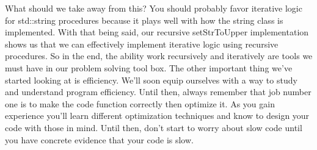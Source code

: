 \documentclass[]{tufte-handout}
\begin{document}
What should we take away from this? You should probably favor iterative logic for std::string procedures because it plays well with how the string class is implemented. With that being said, our recursive setStrToUpper implementation shows us that we can effectively implement iterative logic using recursive procedures. So in the end, the ability work recursively and iteratively are tools we must have in our problem solving tool box.  The other important thing we've started looking at is efficiency.  We'll soon equip ourselves with a way to study and understand program efficiency.  Until then, always remember that job number one is to make the code function correctly then optimize it. As you gain experience you'll learn different optimization techniques and know to design your code with those in mind. Until then, don't start to worry about slow code until you have concrete evidence that your code is slow. 
\end{document}
